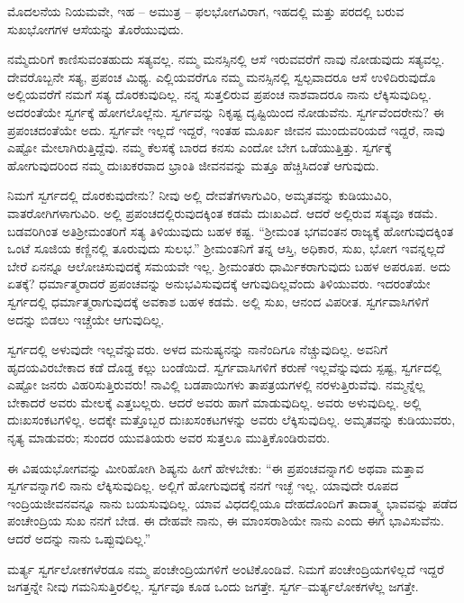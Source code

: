 ಮೊದಲನೆಯ ನಿಯಮವೇ, ಇಹ – ಅಮುತ್ರ – ಫಲಭೋಗವಿರಾಗ, ಇಹದಲ್ಲಿ ಮತ್ತು ಪರದಲ್ಲಿ ಬರುವ ಸುಖಭೋಗಗಳ ಆಸೆಯನ್ನು ತೊರೆಯುವುದು.

ನಮ್ಮೆದುರಿಗೆ ಕಾಣಿಸುವಂತಹುದು ಸತ್ಯವಲ್ಲ. ನಮ್ಮ ಮನಸ್ಸಿನಲ್ಲಿ ಆಸೆ ಇರುವವರೆಗೆ ನಾವು ನೋಡುವುದು ಸತ್ಯವಲ್ಲ. ದೇವರೊಬ್ಬನೇ ಸತ್ಯ, ಪ್ರಪಂಚ ಮಿಥ್ಯ. ಎಲ್ಲಿಯವರೆಗೂ ನಮ್ಮ ಮನಸ್ಸಿನಲ್ಲಿ ಸ್ವಲ್ಪವಾದರೂ ಆಸೆ ಉಳಿದಿರುವುದೊ ಅಲ್ಲಿಯವರೆಗೆ ನಮಗೆ ಸತ್ಯ ದೊರಕುವುದಿಲ್ಲ. ನನ್ನ ಸುತ್ತಲಿರುವ ಪ್ರಪಂಚ ನಾಶವಾದರೂ ನಾನು ಲೆಕ್ಕಿಸುವುದಿಲ್ಲ. ಅದರಂತೆಯೇ ಸ್ವರ್ಗಕ್ಕೆ ಹೋಗಲೊಲ್ಲೆನು. ಸ್ವರ್ಗವನ್ನು ನಿಕೃಷ್ಟ ದೃಷ್ಟಿಯಿಂದ ನೋಡುವೆನು. ಸ್ವರ್ಗವೆಂದರೇನು? ಈ ಪ್ರಪಂಚದಂತೆಯೇ ಅದು. ಸ್ವರ್ಗವೇ ಇಲ್ಲದೆ ಇದ್ದರೆ, ಇಂತಹ ಮೂರ್ಖ ಜೀವನ ಮುಂದುವರಿಯದೆ ಇದ್ದರೆ, ನಾವು ಎಷ್ಟೋ ಮೇಲಾಗಿರುತ್ತಿದ್ದೆವು. ನಮ್ಮ ಕೆಲಸಕ್ಕೆ ಬಾರದ ಕನಸು ಎಂದೋ ಬೇಗ ಒಡೆಯುತ್ತಿತ್ತು. ಸ್ವರ್ಗಕ್ಕೆ ಹೋಗುವುದರಿಂದ ನಮ್ಮ ದುಃಖಕರವಾದ ಭ್ರಾಂತಿ ಜೀವನವನ್ನು ಮತ್ತೂ ಹೆಚ್ಚಿಸಿದಂತೆ ಆಗುವುದು.

ನಿಮಗೆ ಸ್ವರ್ಗದಲ್ಲಿ ದೊರಕುವುದೇನು? ನೀವು ಅಲ್ಲಿ ದೇವತೆಗಳಾಗುವಿರಿ, ಅಮೃತವನ್ನು ಕುಡಿಯುವಿರಿ, ವಾತರೋಗಿಗಳಾಗುವಿರಿ. ಅಲ್ಲಿ ಪ್ರಪಂಚದಲ್ಲಿರುವುದಕ್ಕಿಂತ ಕಡಮೆ ದುಃಖವಿದೆ. ಆದರೆ ಅಲ್ಲಿರುವ ಸತ್ಯವೂ ಕಡಮೆ. ಬಡವರಿಗಿಂತ ಅತಿ\break ಶ‍್ರೀಮಂತರಿಗೆ ಸತ್ಯ ತಿಳಿಯುವುದು ಬಹಳ ಕಷ್ಟ. “ಶ‍್ರೀಮಂತ ಭಗವಂತನ ರಾಜ್ಯಕ್ಕೆ ಹೋಗುವುದಕ್ಕಿಂತ ಒಂಟೆ ಸೂಜಿಯ ಕಣ್ಣಿನಲ್ಲಿ ತೂರುವುದು ಸುಲಭ.'' ಶ‍್ರೀಮಂತನಿಗೆ ತನ್ನ ಆಸ್ತಿ, ಅಧಿಕಾರ, ಸುಖ, ಭೋಗ ಇವನ್ನಲ್ಲದೆ ಬೇರೆ ಏನನ್ನೂ ಆಲೋಚಿಸುವುದಕ್ಕೆ ಸಮಯವೇ ಇಲ್ಲ. ಶ‍್ರೀಮಂತರು ಧಾರ್ಮಿಕರಾಗುವುದು ಬಹಳ ಅಪರೂಪ. ಅದು ಏತಕ್ಕೆ? ಧರ್ಮಾತ್ಮರಾದರೆ ಪ್ರಪಂಚವನ್ನು ಅನುಭವಿಸುವುದಕ್ಕೆ ಆಗುವುದಿಲ್ಲವೆಂದು ತಿಳಿಯುವರು. ಇದರಂತೆಯೇ ಸ್ವರ್ಗದಲ್ಲಿ ಧರ್ಮಾತ್ಮರಾಗುವುದಕ್ಕೆ ಅವಕಾಶ ಬಹಳ ಕಡಮೆ. ಅಲ್ಲಿ ಸುಖ, ಆನಂದ ವಿಪರೀತ. ಸ್ವರ್ಗವಾಸಿಗಳಿಗೆ ಅದನ್ನು ಬಿಡಲು ಇಚ್ಚೆಯೇ ಆಗುವುದಿಲ್ಲ.

ಸ್ವರ್ಗದಲ್ಲಿ ಅಳುವುದೇ ಇಲ್ಲವೆನ್ನುವರು. ಅಳದ ಮನುಷ್ಯನನ್ನು ನಾನೆಂದಿಗೂ ನೆಚ್ಚುವುದಿಲ್ಲ. ಅವನಿಗೆ ಹೃದಯವಿರಬೇಕಾದ ಕಡೆ ದೊಡ್ಡ ಕಲ್ಲು ಬಂಡೆಯಿದೆ. ಸ್ವರ್ಗವಾಸಿಗಳಿಗೆ ಕರುಣೆ ಇಲ್ಲವೆನ್ನುವುದು ಸ್ಪಷ್ಟ, ಸ್ವರ್ಗದಲ್ಲಿ ಎಷ್ಟೋ ಜನರು ವಿಹರಿಸುತ್ತಿರುವರು! ನಾವಿಲ್ಲಿ ಬಡಪಾಯಿಗಳು ತಾಪತ್ರಯಗಳಲ್ಲಿ ನರಳುತ್ತಿರುವೆವು. ನಮ್ಮನ್ನೆಲ್ಲ ಬೇಕಾದರೆ ಅವರು ಮೇಲಕ್ಕೆ ಎತ್ತಬಲ್ಲರು. ಆದರೆ ಅವರು ಹಾಗೆ ಮಾಡುವುದಿಲ್ಲ. ಅವರು ಅಳುವುದಿಲ್ಲ. ಅಲ್ಲಿ ದುಃಖಸಂಕಟಗಳಿಲ್ಲ. ಅದಕ್ಕೇ ಮತ್ತೊಬ್ಬರ ದುಃಖಸಂಕಟಗಳನ್ನು ಅವರು ಲೆಕ್ಕಿಸುವುದಿಲ್ಲ. ಅಮೃತವನ್ನು ಕುಡಿಯುವರು, ನೃತ್ಯ ಮಾಡುವರು; ಸುಂದರ ಯುವತಿಯರು ಅವರ ಸುತ್ತಲೂ ಮುತ್ತಿಕೊಂಡಿರುವರು.

ಈ ವಿಷಯಭೋಗವನ್ನು ಮೀರಿಹೋಗಿ ಶಿಷ್ಯನು ಹೀಗೆ ಹೇಳಬೇಕು: “ಈ ಪ್ರಪಂಚವನ್ನಾಗಲಿ ಅಥವಾ ಮತ್ತಾವ ಸ್ವರ್ಗವನ್ನಾಗಲಿ ನಾನು ಲೆಕ್ಕಿಸುವುದಿಲ್ಲ. ಅಲ್ಲಿಗೆ ಹೋಗುವುದಕ್ಕೆ ನನಗೆ ಇಚ್ಛೆ ಇಲ್ಲ. ಯಾವುದೇ ರೂಪದ ಇಂದ್ರಿಯಜೀವನವನ್ನೂ ನಾನು ಬಯಸುವುದಿಲ್ಲ. ಯಾವ ವಿಧದಲ್ಲಿಯೂ ದೇಹದೊಂದಿಗೆ ತಾದಾತ್ಮ್ಯ ಭಾವವನ್ನು ಪಡೆದ ಪಂಚೇಂದ್ರಿಯ ಸುಖ ನನಗೆ ಬೇಡ. ಈ ದೇಹವೇ ನಾನು, ಈ ಮಾಂಸರಾಶಿಯೇ ನಾನು ಎಂದು ಈಗ ಭಾವಿಸುವೆನು. ಆದರೆ ಅದನ್ನು ನಾನು ಒಪ್ಪುವುದಿಲ್ಲ.”

ಮರ್ತ್ಯ ಸ್ವರ್ಗಲೋಕಗಳೆರಡೂ ನಮ್ಮ ಪಂಚೇಂದ್ರಿಯಗಳಿಗೆ ಅಂಟಿಕೊಂಡಿವೆ. ನಿಮಗೆ ಪಂಚೇಂದ್ರಿಯಗಳಿಲ್ಲದೆ ಇದ್ದರೆ ಜಗತ್ತನ್ನೇ ನೀವು ಗಮನಿಸುತ್ತಿರಲಿಲ್ಲ. ಸ್ವರ್ಗವೂ ಕೂಡ ಒಂದು ಜಗತ್ತೇ. ಸ್ವರ್ಗ–ಮರ್ತ್ಯಲೋಕಗಳೆಲ್ಲ ಜಗತ್ತೇ.

